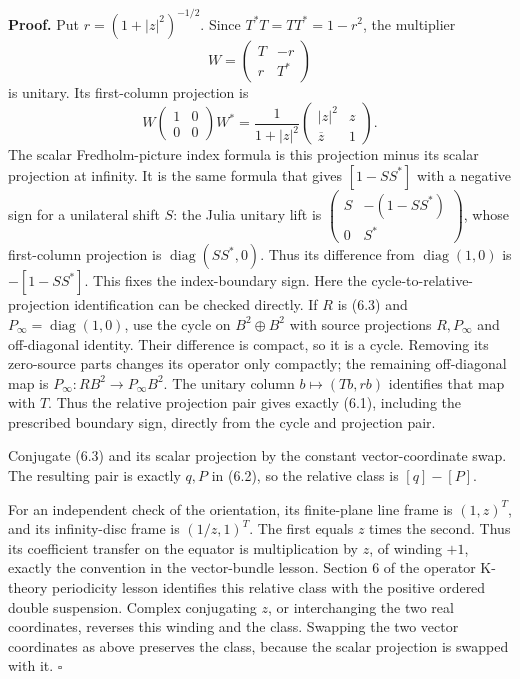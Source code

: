 \documentclass[
  11pt,
]{article}
\begin{document}
\textbf{Proof.} Put \(r=(1+|z|^2)^{-1/2}\). Since \(T^*T=TT^*=1-r^2\),
the multiplier \[
W=\begin{pmatrix}T&-r\\r&T^*\end{pmatrix}
\] is unitary. Its first-column projection is \[
W\begin{pmatrix}1&0\\0&0\end{pmatrix}W^*
=\frac1{1+|z|^2}
\begin{pmatrix}|z|^2&z\\\overline z&1\end{pmatrix}.
\tag{6.3}
\] The scalar Fredholm-picture index formula is this projection minus
its scalar projection at infinity. It is the same formula that gives
\([1-SS^*]\) with a negative sign for a unilateral shift \(S\): the
Julia unitary lift is
\(\left(\begin{smallmatrix}S&-(1-SS^*)\\0&S^*\end{smallmatrix}\right)\),
whose first-column projection is \(\operatorname{diag}(SS^*,0)\). Thus
its difference from \(\operatorname{diag}(1,0)\) is \(-[1-SS^*]\). This
fixes the index-boundary sign. Here the cycle-to-relative-projection
identification can be checked directly. If \(R\) is (6.3) and
\(P_\infty=\operatorname{diag}(1,0)\), use the cycle on
\(B^2\oplus B^2\) with source projections \(R,P_\infty\) and
off-diagonal identity. Their difference is compact, so it is a cycle.
Removing its zero-source parts changes its operator only compactly; the
remaining off-diagonal map is \(P_\infty:R B^2\to P_\infty B^2\). The
unitary column \(b\mapsto(Tb,rb)\) identifies that map with \(T\). Thus
the relative projection pair gives exactly (6.1), including the
prescribed boundary sign, directly from the cycle and projection pair.

Conjugate (6.3) and its scalar projection by the constant
vector-coordinate swap. The resulting pair is exactly \(q,P\) in (6.2),
so the relative class is \([q]-[P]\).

For an independent check of the orientation, its finite-plane line frame
is \((1,z)^T\), and its infinity-disc frame is \((1/z,1)^T\). The first
equals \(z\) times the second. Thus its coefficient transfer on the
equator is multiplication by \(z\), of winding \(+1\), exactly the
convention in the vector-bundle lesson. Section 6 of the operator
K-theory periodicity lesson identifies this relative class with the
positive ordered double suspension. Complex conjugating \(z\), or
interchanging the two real coordinates, reverses this winding and the
class. Swapping the two vector coordinates as above preserves the class,
because the scalar projection is swapped with it. \(\square\)
\end{document}
